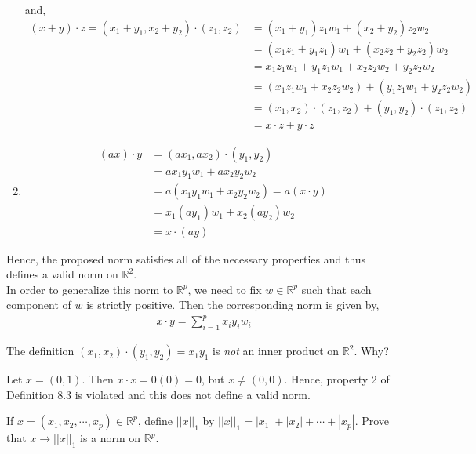 \documentclass[12pt]{article}
\newenvironment{problem}[2][Problem]{\begin{trivlist}
\item[\hskip \labelsep {\bfseries #1}\hskip \labelsep {\bfseries #2.}]}{\end{trivlist}}
\begin{document}
\begin{enumerate}
and, 
\begin{align*}
(x + y) \cdot z = (x_1 + y_1, x_2 + y_2) \cdot (z_1, z_2) &= (x_1 + y_1)z_1w_1 + (x_2 + y_2)z_2w_2\\
&= (x_1z_1 + y_1z_1)w_1 + (x_2z_2 + y_2z_2)w_2\\
&= x_1z_1w_1 + y_1z_1w_1 + x_2z_2w_2 + y_2z_2w_2\\
&= (x_1z_1w_1 + x_2z_2w_2) + (y_1z_1w_1 + y_2z_2w_2)\\
&= (x_1, x_2) \cdot (z_1, z_2) + (y_1, y_2) \cdot (z_1, z_2)\\
&= x \cdot z + y \cdot z
\end{align*}

\item \begin{align*}
(ax) \cdot y &= (ax_1, ax_2) \cdot (y_1, y_2)\\
&= ax_1y_1w_1 + ax_2y_2w_2\\
&= a(x_1y_1w_1 + x_2y_2w_2) = a(x \cdot y)\\
&= x_1(ay_1)w_1 + x_2(ay_2)w_2\\
&= x \cdot (ay)
\end{align*}
\end{enumerate}

Hence, the proposed norm satisfies all of the necessary properties and thus defines a valid norm on $\mathbb{R}^2$.\\

In order to generalize this norm to $\mathbb{R}^p$, we need to fix $w \in \mathbb{R}^p$ such that each component of $w$ is strictly positive. Then the corresponding norm is given by,
\begin{align*}
x \cdot y = \sum_{i=1}^p x_iy_iw_i
\end{align*}

\begin{problem}{8.E} The definition $(x_1, x_2) \cdot (y_1, y_2) = x_1y_1$ is \textit{not} an inner product on $\mathbb{R}^2$. Why?
\end{problem}

Let $x = (0, 1)$. Then $x \cdot x = 0(0) = 0$, but $x \neq (0, 0)$. Hence, property 2 of Definition 8.3 is violated and this does not define a valid norm.

\begin{problem}{8.F} If $x = (x_1, x_2, \cdots, x_p) \in \mathbb{R}^p$, define $||x||_1$ by $||x||_1 = |x_1| + |x_2| + \cdots + |x_p|$. Prove that $x \to ||x||_1$ is a norm on $\mathbb{R}^p$.
\end{problem}
\end{document}

